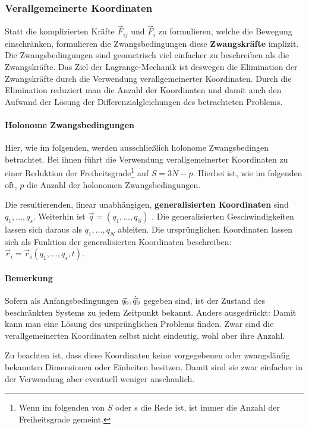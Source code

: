 \subsubsection{Verallgemeinerte Koordinaten}
Statt die komplizierten Kräfte $\vec{F}_{ij}$ und $\vec{F}_i$ zu formulieren, welche die Bewegung einschränken, formulieren die Zwangsbedingungen diese \textbf{Zwangskräfte} implizit.
Die Zwangsbedingungen sind geometrisch viel einfacher zu beschreiben als die Zwangskräfte. Das Ziel der Lagrange-Mechanik ist deswegen die Elimination der Zwangskräfte durch die Verwendung verallgemeinerter Koordinaten. Durch die Elimination reduziert man die Anzahl der Koordinaten und damit auch den Aufwand der Lösung der Differenzialgleichungen des betrachteten Problems.

\paragraph{Holonome Zwangsbedingungen}
Hier, wie im folgenden, werden ausschließlich holonome Zwangsbedingen betrachtet. Bei ihnen führt die Verwendung verallgemeinerter Koordinaten zu einer Reduktion der Freiheitsgrade\footnote{Wenn im folgenden von $S$ oder $s$ die Rede ist, ist immer die Anzahl der Freiheitsgrade gemeint.} auf $S = 3N - p$. Hierbei ist, wie im folgenden oft, $p$ die Anzahl der holonomen Zwangsbedingungen. 

Die resultierenden, linear unabhängigen, \textbf{generalisierten Koordinaten} sind $q_1, \dots, q_s$. Weiterhin ist $\vec{q} = (q_1, \dots, q_S)$
. Die generalisierten Geschwindigkeiten lassen sich daraus als $\dot{q}_1, \dots, \dot{q}_N$ ableiten. Die ursprünglichen Koordinaten lassen sich als Funktion der generalisierten Koordinaten beschreiben: $\vec{r}_i = \vec{r}_i(q_1, \dots, q_s, t)$.

\paragraph{Bemerkung}
Sofern als Anfangsbedingungen $\vec{q}_0, \dot{\vec{q}}_0$ gegeben sind, ist der Zustand des beschränkten Systems zu jedem Zeitpunkt bekannt. Anders ausgedrückt: Damit kann man eine Lösung des ursprünglichen Problems finden. Zwar sind die verallgemeinerten Koordinaten selbst nicht eindeutig, wohl aber ihre Anzahl.

Zu beachten ist, dass diese Koordinaten keine vorgegebenen oder zwangsläufig bekannten Dimensionen oder Einheiten besitzen. Damit sind sie zwar einfacher in der Verwendung aber eventuell weniger anschaulich.
